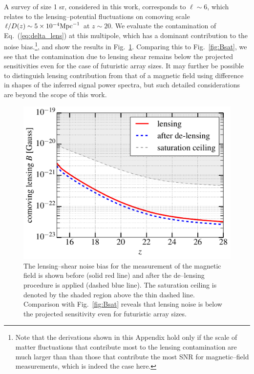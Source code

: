 \documentclass[aps,prd,twocolumn,floatfix,showpacs,superscriptaddress,nofootinbib]{revtex4-1}
\begin{document}
A survey of size 1 sr, considered in this work, corresponds to $\ell\sim 6$, which relates to the lensing--potential fluctuations on comoving scale $\ell/D(z)\sim 5\times 10^{-4}{\rm Mpc}^{-1}$ at $z\sim 20$. We evaluate the contamination of Eq.~(\ref{eq:delta_lens}) at this multipole, which has a dominant contribution to the noise bias.\footnote{Note that the derivations shown in this Appendix hold only if the scale of matter fluctuations that contribute most to the lensing contamination are much larger than than those that contribute the most SNR for magnetic--field measurements, which is indeed the case here.}, and show the results in Fig.~\ref{fig:lensing_B}. Comparing this to Fig.~\ref{fig:Bsat}, we see that the contamination due to lensing shear remains below the projected sensitivities even for the case of futuristic array sizes. It may further be possible to distinguish lensing contribution from that of a magnetic field using difference in shapes of the inferred signal power spectra, but such detailed considerations are beyond the scope of this work.
\begin{figure}[h]
\centering  
\includegraphics[scale=0.4]{delensingB.pdf}
\caption{The lensing--shear noise bias for the measurement of the magnetic field is shown before (solid red line) and after the de--lensing procedure is applied (dashed blue line). The saturation ceiling is denoted by the shaded region above the thin dashed line. Comparison with Fig.~\ref{fig:Bsat} reveals that lensing noise is below the projected sensitivity even for futuristic array sizes.}
\label{fig:lensing_B}
\end{figure}
\end{document}
